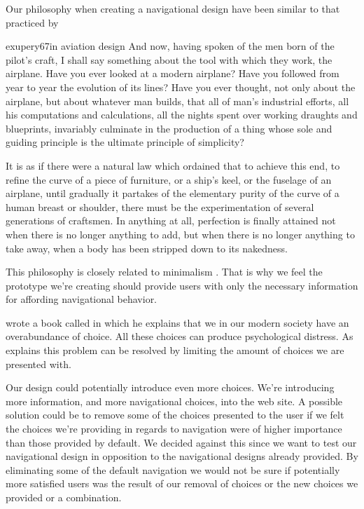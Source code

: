 Our philosophy when creating a navigational design have been
similar to that practiced by
\begin{fullquotation}[\chap{3}]{exupery67}{in aviation design}
  \noindent
  And now, having spoken of the men born of the pilot's craft, I shall say
  something about the tool with which they work, the airplane. Have you
  ever looked at a modern airplane? Have you followed from year to year
  the evolution of its lines? Have you ever thought, not only about the
  airplane, but about whatever man builds, that all of man's industrial
  efforts, all his computations and calculations, all the nights spent
  over working draughts and blueprints, invariably culminate in the
  production of a thing whose sole and guiding principle is the ultimate
  principle of simplicity?

  It is as if there were a natural law which ordained that to achieve this
  end, to refine the curve of a piece of furniture, or a ship's keel, or
  the fuselage of an airplane, until gradually it partakes of the
  elementary purity of the curve of a human breast or shoulder, there must
  be the experimentation of several generations of craftsmen. In anything
  at all, perfection is finally attained not when there is no longer
  anything to add, but when there is no longer anything to take away,
  when a body has been stripped down to its nakedness.
\end{fullquotation}

This philosophy is closely related to minimalism%
.
That is why we feel the prototype we're creating should provide users
with only the necessary information for affording navigational behavior.

\citet{schwartz04} wrote a book called
 in which he explains that
we in our modern society have an overabundance of choice. All these choices
can produce psychological distress. As \citeauthor{schwartz04} explains this
problem can be resolved by limiting the amount of choices we are presented
with.

Our design could potentially introduce even more choices. We're
introducing more information, and more navigational choices, into the
\urort{} web site. A possible solution could be to remove some of the
choices presented to the user if we felt the choices we're providing in
regards to navigation were of higher importance than those provided by
default. We decided against this since we want to test our navigational
design in opposition to the navigational designs already provided. By
eliminating some of the default navigation we would not be sure
if potentially more satisfied users was the result of our removal of
choices or the new choices we provided or a combination.

